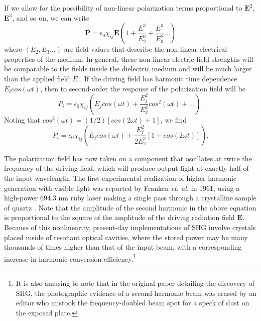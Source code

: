 \documentclass [10pt, twoside] {uwthesis}[2012/04/02]
\begin{document}
If we allow for the possibility of non-linear polarization terms proportional to $\mathbf{E}^2$, $\mathbf{E}^3$, and so on, we can write 
\begin{equation} \mathbf{P} = \epsilon_0\chi_{ij}\mathbf{E} (1 + \dfrac{E^2}{E_2^2} + \dfrac{E^3}{E_3^2} ...) \end{equation} where $(E_2,E_3...)$ are field values that describe the non-linear electrical properties of the medium. In general, these non-linear electric field strengths will be comparable to the fields inside the dielectric medium and will be much larger than the applied field $E$ \cite{1961_Franken_SHG}. If the driving field has harmonic time dependence $E_i cos (\omega t)$, then to second-order the response of the polarization field will be 
\begin{equation} P_i = \epsilon_0\chi_{ij} (E_j cos(\omega t) + \dfrac{E_j^2}{E_2^2} cos^2(\omega t)+...). \end{equation}
Noting that $cos^2(\omega t) = (1/2)[cos(2\omega t)+1]$, we find 
\begin{equation} P_i = \epsilon_0\chi_{ij} (E_j cos(\omega t) + \dfrac{E_j^2}{2E_2^2}[1+cos(2\omega t)]).\end{equation}

The polarization field has now taken on a component that oscillates at twice the frequency of the driving field, which will produce output light at exactly half of the input wavelength. The first experimental realization of higher harmonic generation with visible light was reported by Franken \textit{et. al.} in 1961, using a high-power 694.3 nm ruby laser making a single pass through a crystalline sample of quartz \cite{1961_Franken_SHG}. Note that the amplitude of the second harmonic in the above equation is proportional to the square of the amplitude of the driving radiation field $\mathbf{E}$. Because of this nonlinearity, present-day implementations of SHG involve crystals placed inside of resonant optical cavities, where the stored power may be many thousands of times higher than that of the input beam, with a corresponding increase in harmonic conversion efficiency.\footnote{It is also amusing to note that in the original paper detailing the discovery of SHG, the photographic evidence of a second-harmonic beam was erased by an editor who mistook the frequency-doubled beam spot for a speck of dust on the exposed plate.}  
\end{document}
